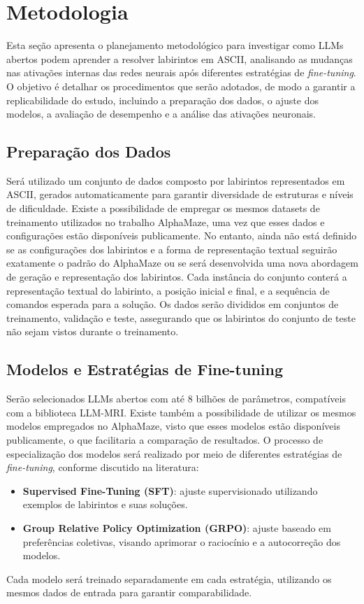 \section{Metodologia}\label{sec:metodologia}

Esta seção apresenta o planejamento metodológico para investigar como LLMs abertos podem aprender a resolver labirintos em ASCII, analisando as mudanças nas ativações internas das redes neurais após diferentes estratégias de \textit{fine-tuning}. O objetivo é detalhar os procedimentos que serão adotados, de modo a garantir a replicabilidade do estudo, incluindo a preparação dos dados, o ajuste dos modelos, a avaliação de desempenho e a análise das ativações neuronais.

\subsection{Preparação dos Dados}

Será utilizado um conjunto de dados composto por labirintos representados em ASCII, gerados automaticamente para garantir diversidade de estruturas e níveis de dificuldade. Existe a possibilidade de empregar os mesmos datasets de treinamento utilizados no trabalho AlphaMaze, uma vez que esses dados e configurações estão disponíveis publicamente. No entanto, ainda não está definido se as configurações dos labirintos e a forma de representação textual seguirão exatamente o padrão do AlphaMaze ou se será desenvolvida uma nova abordagem de geração e representação dos labirintos. Cada instância do conjunto conterá a representação textual do labirinto, a posição inicial e final, e a sequência de comandos esperada para a solução. Os dados serão divididos em conjuntos de treinamento, validação e teste, assegurando que os labirintos do conjunto de teste não sejam vistos durante o treinamento.

\subsection{Modelos e Estratégias de Fine-tuning}

Serão selecionados LLMs abertos com até 8 bilhões de parâmetros, compatíveis com a biblioteca LLM-MRI. Existe também a possibilidade de utilizar os mesmos modelos empregados no AlphaMaze, visto que esses modelos estão disponíveis publicamente, o que facilitaria a comparação de resultados. O processo de especialização dos modelos será realizado por meio de diferentes estratégias de \textit{fine-tuning}, conforme discutido na literatura:
\begin{itemize}
    \item \textbf{Supervised Fine-Tuning (SFT)}: ajuste supervisionado utilizando exemplos de labirintos e suas soluções.
    \item \textbf{Group Relative Policy Optimization (GRPO)}: ajuste baseado em preferências coletivas, visando aprimorar o raciocínio e a autocorreção dos modelos.
\end{itemize}
Cada modelo será treinado separadamente em cada estratégia, utilizando os mesmos dados de entrada para garantir comparabilidade.

